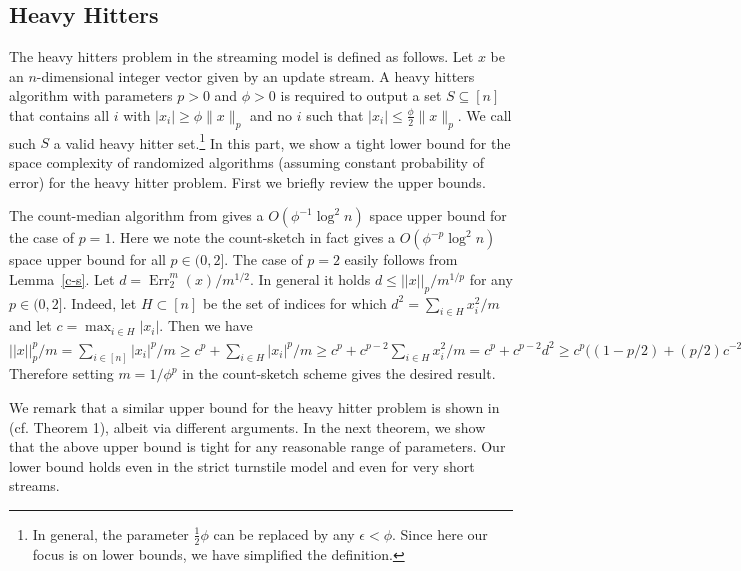 \documentclass[9pt,letterpaper]{article}
\newtheorem{theorem}{Theorem}
\theoremstyle{remark}
\DeclareMathOperator{\err}{Err}
\begin{document}
\subsection{Heavy Hitters}\label{sec:hh}
The heavy hitters problem in the streaming model is defined as follows. Let
$x$ be an $n$-dimensional integer vector given by an update stream.
A heavy hitters algorithm with parameters $p>0$ and $\phi>0$ is
required to output a set $S\subseteq [n]$ that contains
all $i$ with $|x_i|\geq \phi\|x\|_p$ and no $i$ such
that $|x_i|\leq \frac{\phi}{2}\|x\|_p$. We call such $S$ a valid heavy hitter
set.\footnote{ In general, the parameter $\frac12\phi$
can be replaced by any $\epsilon < \phi$. 
 Since here our 
focus is on lower bounds, we have simplified the definition.} 
In this part, we show a tight lower bound for the
 space complexity of randomized algorithms (assuming
constant probability of error) for 
the heavy hitter problem. First we briefly review the upper bounds.

The count-median algorithm from \cite{CormodeM05} gives
 a $O(\phi^{-1}\log^2 n)$ space upper bound for the case of $p=1$.
Here we note the count-sketch \cite{CharikarCF04} in fact 
gives a $O(\phi^{-p}\log^2 n)$ space upper bound for all $p \in (0,2]$.
The case of $p=2$ easily follows from Lemma~\ref{c-s}. Let $d=\err^m_2(x)/m^{1/2}$.
In general it holds $d \le ||x||_p/m^{1/p}$ for any
$p\in(0,2]$. Indeed, let $H \subset [n]$ be the set of indices for which
$ d^2=\sum_{i\in H}x_i^2/m$ and let $c=\max_{i\in H}|x_i|$. Then we have
$||x||_p^p/m=\sum_{i\in[n]}|x_i|^p/m\ge c^p+\sum_{i\in H}|x_i|^p/m\ge
c^p+c^{p-2}\sum_{i\in
H}x_i^2/m=c^p+c^{p-2}d^2\ge c^p((1-p/2)+(p/2)c^{-2}d^2\ge
c^p(c^{-2}d^2)^{p/2}=d^p.$ Therefore setting $m=1/\phi^p$ in the count-sketch
scheme gives the desired result.


We remark that a similar upper bound for the heavy hitter problem is 
shown in \cite{KaneNPW} (cf. Theorem 1), albeit via different arguments.  
%
%
In the next theorem, we show that the above upper bound is tight for
any reasonable range of parameters. Our lower bound holds even in the strict
turnstile model and even for very short streams.
\end{document}
